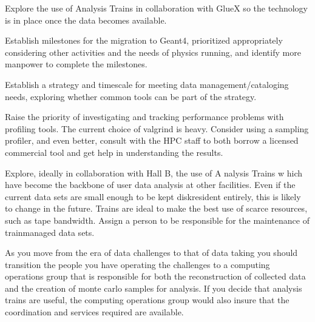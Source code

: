 \documentclass[12pt]{article}
\begin{document}
Explore the use of Analysis Trains in collaboration with GlueX so the technology is in place once the data becomes available.

Establish milestones for the migration to Geant4, prioritized appropriately considering other activities and the needs of physics running, and identify more manpower to complete the milestones.

Establish a strategy and timescale for meeting data management/cataloging needs, exploring whether common tools can be part of the strategy.

Raise the priority of investigating and tracking performance problems with profiling tools. The current choice of valgrind is heavy. Consider using a sampling profiler, and even better, consult with the HPC staff to both borrow a licensed commercial tool and get help in understanding the results.

Explore, ideally in collaboration with Hall B, the use of A nalysis Trains w hich have become the backbone of user data analysis at other facilities. Even if the current data sets are small enough to be kept disk­resident entirely, this is likely to change in the future. Trains are ideal to make the best use of scarce resources, such as tape bandwidth. Assign a person to be responsible for the maintenance of train­managed data sets. 

As you move from the era of data challenges to that of data taking you should transition the people you have operating the challenges to a computing operations group that is responsible for both the reconstruction of collected data and the creation of monte carlo samples for analysis. If you decide that analysis trains are useful, the computing operations group would also insure that the coordination and services required are available. 
\end{document}
